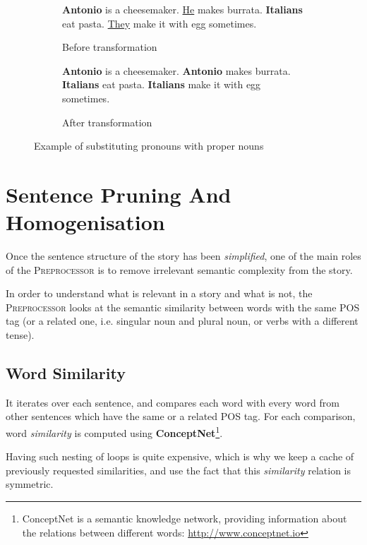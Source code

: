 \begin{figure}[H]
\begin{subfigure}{\textwidth}
\begin{displayquote}
\textbf{Antonio} is a cheesemaker. \underline{He} makes burrata.
\textbf{Italians} eat pasta. \underline{They} make it with egg sometimes.
\end{displayquote}
\caption{Before transformation}
\vspace{\baselineskip}
\end{subfigure}
\begin{subfigure}{\textwidth}
\begin{displayquote}
\textbf{Antonio} is a cheesemaker. \textbf{Antonio} makes burrata.
\textbf{Italians} eat pasta. \textbf{Italians} make it with egg sometimes.
\end{displayquote}
\caption{After transformation}
\end{subfigure}
\caption{Example of substituting pronouns with proper nouns}
\label{fig:pronoun_substitution}
\end{figure}

\section{Sentence Pruning And Homogenisation}
\label{sec:pruning_homogenisation}

Once the sentence structure of the story has been \textit{simplified}, one of the main roles of the \textsc{Preprocessor} is to remove irrelevant semantic complexity from the story.

In order to understand what is relevant in a story and what is not, the \textsc{Preprocessor} looks at the semantic similarity between words with the same POS tag (or a related one, i.e. singular noun and plural noun, or verbs with a different tense).

\subsection{Word Similarity}

It iterates over each sentence, and compares each word with every word from other sentences which have the same or a related POS tag. For each comparison, word \textit{similarity} is computed using \textbf{ConceptNet}\footnote{ConceptNet is a semantic knowledge network, providing information about the relations between different words: \url{http://www.conceptnet.io}}.

Having such nesting of loops is quite expensive, which is why we keep a cache of previously requested similarities, and use the fact that this \textit{similarity} relation is symmetric.

